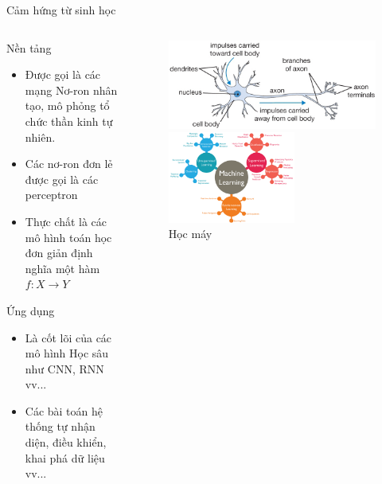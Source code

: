     \begin{frame}{Cảm hứng từ sinh học}
        \begin{columns}
		\begin{itemize}
    		\begin{block}{Nền tảng}
    		    \begin{itemize}
    		    \item Được gọi là các mạng Nơ-ron nhân tạo, mô phỏng tổ chức thần kinh tự nhiên.
    		    \item Các nơ-ron đơn lẻ được gọi là các perceptron
    		    \item Thực chất là các mô hình toán học đơn giản định nghĩa một hàm $f: X \rightarrow Y$
    		    \end{itemize}
    		\end{block}
    		\begin{block}{Ứng dụng}
    		    \begin{itemize}
    		    \item Là cốt lõi của các mô hình Học sâu như CNN, RNN vv...
    		    \item Các bài toán hệ thống tự nhận diện, điều khiển, khai phá dữ liệu vv...
    		    \end{itemize}
    		\end{block}
		\end{itemize}
		\begin{figure}[ht]
            \centering
            \includegraphics[width=1.0\linewidth]{images/neuron-net.png}
            \caption{Nơ-ron sinh học}
            \label{fig:problem:neural-architect}
            \includegraphics[width=1.0\linewidth, height=3cm]{images/machine.png}
            \caption{Học máy}
        \end{figure}
        
		\end{columns}
	\end{frame}
	
